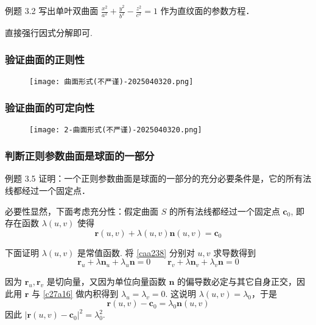 \begin{exercise}
例题 3.2 写出单叶双曲面 $\frac{x^2}{a^2}+\frac{y^2}{b^2}-\frac{z^2}{c^2}=1$ 作为直纹面的参数方程．
\end{exercise}
直接强行因式分解即可.

\subsubsection{验证曲面的正则性}

\begin{figure}[H]
\centering
\texttt{[image: 曲面形式(不严谨)-2025040320.png]}
\label{}
\end{figure}

\subsubsection{验证曲面的可定向性}

\begin{figure}[H]
\centering
\texttt{[image: 2-曲面形式(不严谨)-2025040320.png]}
\label{}
\end{figure}

\subsubsection{判断正则参数曲面是球面的一部分}

\begin{exercise}
例题 3.5 证明：一个正则参数曲面是球面的一部分的充分必要条件是，它的所有法线都经过一个固定点．
\end{exercise}
必要性显然，下面考虑充分性：假定曲面 $S$ 的所有法线都经过一个固定点 $\boldsymbol{c}_{0}$, 即存在函数 $\lambda(u,v)$ 使得
\begin{equation}
\boldsymbol{r}(u,v)+\lambda(u,v)\boldsymbol{n}(u,v)=\boldsymbol{c}_{0}
\label{caa238}
\end{equation}

下面证明 $\lambda(u,v)$ 是常值函数. 将 \cref{caa238} 分别对 $u,v$ 求导数得到
\begin{equation}
\boldsymbol{r}_{u}+\lambda \boldsymbol{n}_{u}+\lambda_{u}\boldsymbol{n}=0\qquad \boldsymbol{r}_{v}+\lambda \boldsymbol{n}_{v}+\lambda_{v}\boldsymbol{n}=0
\label{c27a16}
\end{equation}

因为 $\boldsymbol{r}_{u},\boldsymbol{r}_{v}$ 是切向量，又因为单位向量函数 $\boldsymbol{n}$ 的偏导数必定与其它自身正交，因此用 $\boldsymbol{r}$ 与 \cref{c27a16} 做内积得到 $\lambda_{u}=\lambda_{v}=0$. 这说明 $\lambda(u,v)=\lambda_0$，于是
\[
\boldsymbol{r}(u,v)-\boldsymbol{c}_{0}=\lambda_{0}\boldsymbol{n}(u,v)
\]
因此 $\lvert \boldsymbol{r}(u,v)-\boldsymbol{c}_{0} \rvert ^2=\lambda^{2}_{0}$.

